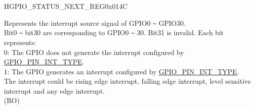 \begin{register}{H}{GPIO\_STATUS\_NEXT\_REG}{0x014C}\label{regdesc:GPIOSTATUSNEXTREG}
%
\regnewline%
\begin{regdesc}\begin{reglist}
\label{fielddesc:GPIOSTATUSINTERRUPTNEXT}\item [GPIO\_STATUS\_INTERRUPT\_NEXT] Represents the interrupt source signal of GPIO0 \verb+~+ GPIO30.\\
Bit0 \verb+~+ bit30 are corresponding to GPIO0 \verb+~+ 30. Bit31 is invalid. Each bit represents:\\
0: The GPIO does not generate the interrupt configured by \hyperref[fielddesc:GPIOPINNINTTYPE]{GPIO\_PIN\_INT\_TYPE}.\\
1: The GPIO generates an interrupt configured by \hyperref[fielddesc:GPIOPINNINTTYPE]{GPIO\_PIN\_INT\_TYPE}.\\
The interrupt could be rising edge interrupt, falling edge interrupt, level sensitive interrupt and any edge interrupt.\\  (RO)
\end{reglist}\end{regdesc}
\end{register}


